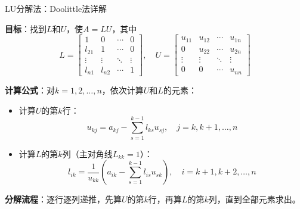 \documentclass[UTF8,aspectratio=169]{beamer}
\begin{document}
\begin{frame}{LU分解法：Doolittle法详解}
        \item \textbf{目标}：找到$L$和$U$，使$A=LU$，其中
        \[
            L = \begin{bmatrix}
                1      & 0      & \cdots & 0 \\
                l_{21} & 1      & \cdots & 0 \\
                \vdots & \vdots & \ddots & \vdots \\
                l_{n1} & l_{n2} & \cdots & 1
            \end{bmatrix},\quad
            U = \begin{bmatrix}
                u_{11} & u_{12} & \cdots & u_{1n} \\
                0      & u_{22} & \cdots & u_{2n} \\
                \vdots & \vdots & \ddots & \vdots \\
                0      & 0      & \cdots & u_{nn}
            \end{bmatrix}
        \]
        \item \textbf{计算公式}：对$k=1,2,\ldots,n$，依次计算$U$和$L$的元素：
        \begin{itemize}
            \item 计算$U$的第$k$行：
            \[
                u_{kj} = a_{kj} - \sum_{s=1}^{k-1} l_{ks}u_{sj},\quad j=k,k+1,\ldots,n
            \]
            \item 计算$L$的第$k$列（主对角线$L_{kk}=1$）：
            \[
                l_{ik} = \frac{1}{u_{kk}}\left(a_{ik} - \sum_{s=1}^{k-1} l_{is}u_{sk}\right),\quad i=k+1,k+2,\ldots,n
            \]
        \end{itemize}
        \item \textbf{分解流程}：逐行逐列递推，先算$U$的第$k$行，再算$L$的第$k$列，直到全部元素求出。
\end{frame}
\end{document}
